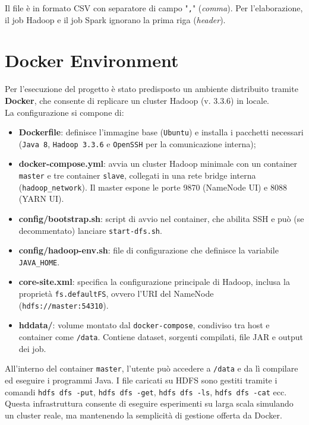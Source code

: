 		Il file è in formato CSV con separatore di campo "\texttt{,}" (\textit{comma}). Per l'elaborazione, il job Hadoop e il job Spark ignorano la prima riga (\textit{header}).
	
	\section{Docker Environment}
		Per l’esecuzione del progetto è stato predisposto un ambiente distribuito tramite \textbf{Docker}, che consente di replicare un cluster Hadoop (v. 3.3.6) in locale. \\
		La configurazione si compone di:
		
		\begin{itemize}
			\item \textbf{Dockerfile}: definisce l’immagine base (\texttt{Ubuntu}) e installa i pacchetti necessari (\texttt{Java 8}, \texttt{Hadoop 3.3.6} e \texttt{OpenSSH} per la comunicazione interna);
			\item \textbf{docker-compose.yml}: avvia un cluster Hadoop minimale con un container \texttt{master} e tre container \texttt{slave}, collegati in una rete bridge interna (\texttt{hadoop\_network}). Il master espone le porte 9870 (NameNode UI) e 8088 (YARN UI).
			\item \textbf{config/bootstrap.sh}: script di avvio nel container, che abilita SSH e può (se decommentato) lanciare \texttt{start-dfs.sh}.
			\item \textbf{config/hadoop-env.sh}: file di configurazione che definisce la variabile \texttt{JAVA\_HOME}.
			\item \textbf{core-site.xml}: specifica la configurazione principale di Hadoop, inclusa la proprietà \texttt{fs.defaultFS}, ovvero l'URI del NameNode (\texttt{hdfs://master:54310}).
			\item \textbf{hddata/}: volume montato dal \texttt{docker-compose}, condiviso tra host e container come \texttt{/data}. Contiene dataset, sorgenti compilati, file JAR e output dei job.
		\end{itemize}
		
		All'interno del container \texttt{master}, l'utente può accedere a \texttt{/data} e da lì compilare ed eseguire i programmi Java. I file caricati su HDFS sono gestiti tramite i comandi \texttt{hdfs dfs -put}, \texttt{hdfs dfs -get}, \texttt{hdfs dfs -ls}, \texttt{hdfs dfs -cat} ecc. \\
		Questa infrastruttura consente di eseguire esperimenti su larga scala simulando un cluster reale, ma mantenendo la semplicità di gestione offerta da Docker.